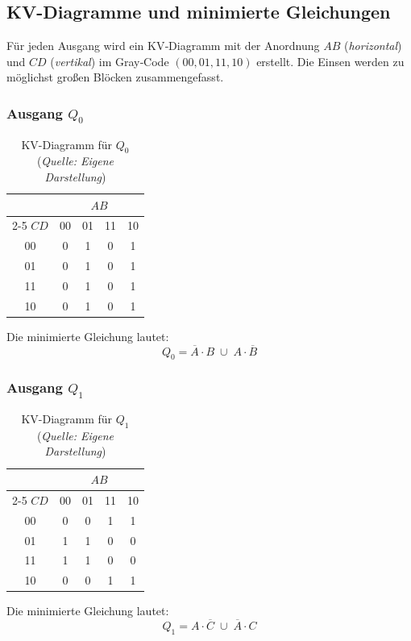 \subsection{KV-Diagramme und minimierte Gleichungen}
Für jeden Ausgang wird ein KV‑Diagramm mit der Anordnung \(AB\) (\textit{horizontal}) und \(CD\) (\textit{vertikal}) im Gray‑Code \((\textit{00}, \textit{01}, \textit{11}, \textit{10})\) erstellt. 
Die Einsen werden zu möglichst großen Blöcken zusammengefasst.
\subsubsection{\texorpdfstring{Ausgang \(Q_0\)}{Ausgang Q0}}
\begin{table}[h]
\centering
\begin{tabular}{c|cccc}
\multicolumn{1}{c}{} & \multicolumn{4}{c}{\(AB\)} \\
\cline{2-5}
\(CD\) & 00 & 01 & 11 & 10 \\
\hline
00 & 0 & 1 & 0 & 1 \\
01 & 0 & 1 & 0 & 1 \\
11 & 0 & 1 & 0 & 1 \\
10 & 0 & 1 & 0 & 1 \\
\hline
\end{tabular}
\caption{KV-Diagramm für \(Q_0\) (\textit{Quelle: Eigene Darstellung})}
\end{table}
Die minimierte Gleichung lautet: \hspace{4cm} \[\boxed{Q_0 = \overline{A} \cdot B \;\cup\; A \cdot \overline{B}}\]
\subsubsection{\texorpdfstring{Ausgang \(Q_1\)}{Ausgang Q1}}
\begin{table}[h]
\centering
\begin{tabular}{c|cccc}
\multicolumn{1}{c}{} & \multicolumn{4}{c}{\(AB\)} \\
\cline{2-5}
\(CD\) & 00 & 01 & 11 & 10 \\
\hline
00 & 0 & 0 & 1 & 1 \\
01 & 1 & 1 & 0 & 0 \\
11 & 1 & 1 & 0 & 0 \\
10 & 0 & 0 & 1 & 1 \\
\hline
\end{tabular}
\caption{KV-Diagramm für \(Q_1\) (\textit{Quelle: Eigene Darstellung})}
\end{table}
Die minimierte Gleichung lautet: \hspace{4cm} \[\boxed{Q_1 = A \cdot \overline{C} \;\cup\; \overline{A} \cdot C}\]
